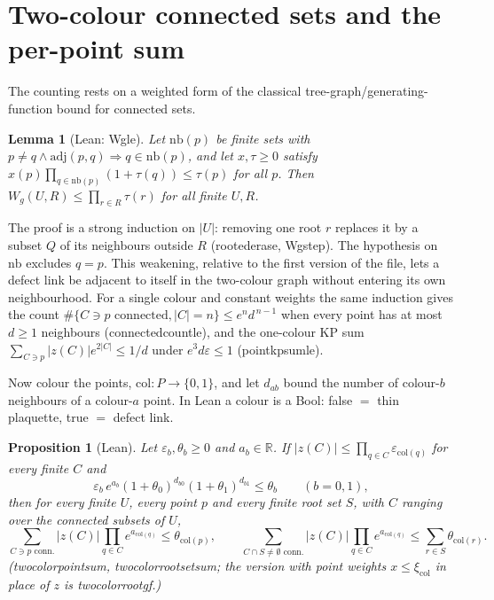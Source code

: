 \documentclass[11pt,a4paper]{article}
\newtheorem{lemma}[theorem]{Lemma}
\newtheorem{proposition}[theorem]{Proposition}
\theoremstyle{definition}
\theoremstyle{remark}
\DeclareRobustCommand{\lean}[1]{{\ttfamily\renewcommand{\_}{\textunderscore\allowbreak}#1}}
\newcommand{\R}{\mathbb{R}}
\begin{document}
\section{Two-colour connected sets and the per-point sum}\label{sec:twocolour}

The counting rests on a weighted form of the classical tree-graph/generating-function bound for connected sets.

\begin{lemma}[Lean: \lean{Wg\_le}]\label{lem:Wg}
Let $\mathrm{nb}(p)$ be finite sets with $p\neq q\wedge\mathrm{adj}(p,q)\Rightarrow q\in\mathrm{nb}(p)$, and let $x,\tau\ge0$ satisfy $x(p)\prod_{q\in\mathrm{nb}(p)}(1+\tau(q))\le\tau(p)$ for all $p$. Then $W_g(U,R)\le\prod_{r\in R}\tau(r)$ for all finite $U,R$.
\end{lemma}
The proof is a strong induction on $|U|$: removing one root $r$ replaces it by a subset $Q$ of its neighbours outside $R$ (\lean{rooted\_erase}, \lean{Wg\_step}). The hypothesis on $\mathrm{nb}$ excludes $q=p$. This weakening, relative to the first version of the file, lets a defect link be adjacent to itself in the two-colour graph without entering its own neighbourhood. For a single colour and constant weights the same induction gives the count $\#\{C\ni p\text{ connected},|C|=n\}\le e^n d^{\,n-1}$ when every point has at most $d\ge1$ neighbours (\lean{connected\_count\_le}), and the one-colour KP sum $\sum_{C\ni p}|z(C)|e^{2|C|}\le1/d$ under $e^3d\varepsilon\le1$ (\lean{point\_kp\_sum\_le}).

Now colour the points, $\mathrm{col}:P\to\{0,1\}$, and let $d_{ab}$ bound the number of colour-$b$ neighbours of a colour-$a$ point. In Lean a colour is a \lean{Bool}: \lean{false} $=$ thin plaquette, \lean{true} $=$ defect link.

\begin{proposition}[Lean]\label{prop:twocol}
Let $\varepsilon_b,\theta_b\ge0$ and $a_b\in\R$. If $|z(C)|\le\prod_{q\in C}\varepsilon_{\mathrm{col}(q)}$ for every finite $C$ and
\[
\varepsilon_b\,e^{a_b}(1+\theta_0)^{d_{b0}}(1+\theta_1)^{d_{b1}}\le\theta_b\qquad(b=0,1),
\]
then for every finite $U$, every point $p$ and every finite root set $S$, with $C$ ranging over the connected subsets of $U$,
\[
\sum_{C\ni p\text{ conn.}}|z(C)|\prod_{q\in C}e^{a_{\mathrm{col}(q)}}\le\theta_{\mathrm{col}(p)},\qquad
\sum_{C\cap S\ne\emptyset\text{ conn.}}|z(C)|\prod_{q\in C}e^{a_{\mathrm{col}(q)}}\le\sum_{r\in S}\theta_{\mathrm{col}(r)}.
\]
(\lean{two\_color\_point\_sum}, \lean{two\_color\_root\_set\_sum}; the version with point weights $x\le\xi_{\mathrm{col}}$ in place of $z$ is \lean{two\_color\_root\_gf}.)
\end{proposition}
\end{document}
